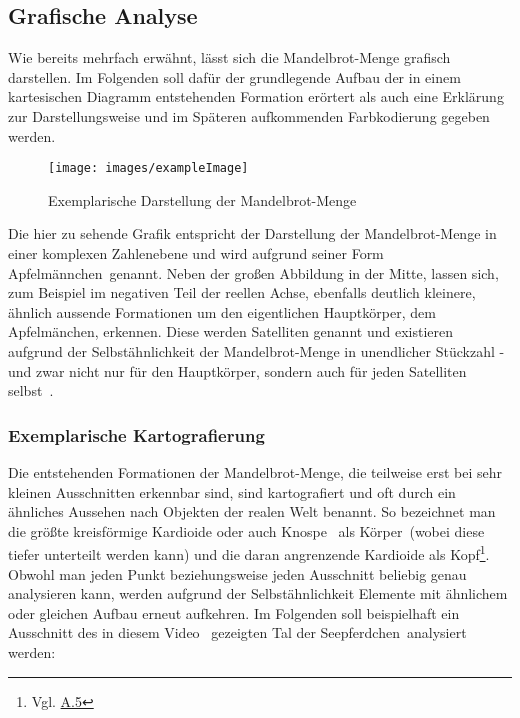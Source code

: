 \subsection{Grafische Analyse}\label{subsec:graphical-analysis}

Wie bereits mehrfach erwähnt, lässt sich die Mandelbrot-Menge grafisch darstellen.
Im Folgenden soll dafür der grundlegende Aufbau der in einem kartesischen Diagramm
entstehenden Formation erörtert als auch eine Erklärung zur Darstellungsweise
und im Späteren aufkommenden Farbkodierung gegeben werden.

\bigskip
\begin{figure}[h!]\label{fig:mandelbrot-set}
  \centering
  \texttt{[image: images/exampleImage]}
  \caption[Caption for LOF]{
    Exemplarische Darstellung der Mandelbrot-Menge\footnotemark
  }
\end{figure}

Die hier zu sehende Grafik entspricht der Darstellung der Mandelbrot-Menge
in einer komplexen Zahlenebene und wird aufgrund seiner Form
\glqq Apfelm\"annchen\grqq~genannt.
Neben der großen Abbildung in der Mitte, lassen sich,
zum Beispiel im negativen Teil der reellen Achse,
ebenfalls deutlich kleinere, ähnlich aussende Formationen um den
eigentlichen Hauptkörper, dem Apfelm\"anchen, erkennen.
Diese werden Satelliten genannt und existieren aufgrund der Selbstähnlichkeit
der Mandelbrot-Menge in unendlicher Stückzahl - und zwar nicht nur für den Hauptkörper,
sondern auch für jeden Satelliten selbst~\cite{lomonaco_quasi-conformal_2018}.

\subsubsection{Exemplarische Kartografierung}

Die entstehenden Formationen der Mandelbrot-Menge, die teilweise erst bei sehr
kleinen Ausschnitten erkennbar sind, sind kartografiert und oft durch
ein ähnliches Aussehen nach Objekten der realen Welt benannt.
So bezeichnet man die größte kreisförmige Kardioide oder auch \glqq Knospe\grqq
~als \glqq K\"orper\grqq~(wobei diese tiefer unterteilt werden kann)
und die daran angrenzende Kardioide als
\glqq Kopf\grqq\footnote{Vgl. \hyperref[app:5]{A.5}}.
Obwohl man jeden Punkt beziehungsweise jeden Ausschnitt beliebig genau
analysieren kann, werden aufgrund der Selbstähnlichkeit Elemente mit ähnlichem
oder gleichen Aufbau erneut aufkehren.
Im Folgenden soll beispielhaft ein Ausschnitt des in diesem
Video~\cite{beyer_zoomfahrt_2017} gezeigten
\glqq Tal der Seepferdchen\grqq~analysiert werden:


